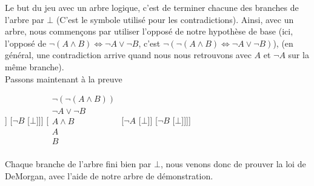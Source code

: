\documentclass[a4paper, 12pt]{article}
\newcommand{\ffi}{\Leftrightarrow}
\numberwithin{equation}{subsection}
\begin{document}
  Le but du jeu avec un arbre logique, c'est de terminer chacune des branches de l'arbre par $\bot$ (C'est le symbole utilisé pour les contradictions). Ainsi, avec un arbre, nous commençons par utiliser l'opposé de notre hypothèse de base (ici, l'opposé de $\neg (A \land B) \ffi \neg A \lor \neg B$, c'est $\neg (\neg (A \land B) \ffi \neg A \lor \neg B)$), (en général, une contradiction arrive quand nous nous retrouvons avec $A$ et $\neg A$ sur la même branche). \\

  Passons maintenant à la preuve
  \begin{center}
  \begin{forest}
  [$\neg (\neg (A \land B) \ffi \neg A \lor \neg B)$
  [$\begin{array}{c}
    \neg(A \land B)\\
    \neg (\neg A \lor \neg B)\\
    A \\
    B \\
   \end{array}$
    [$\neg A$
    [$\bot$]]
    [$\neg B$
    [$\bot$]]]
    [$\begin{array}{c}
        \neg (\neg (A \land B)) \\
        \neg A \lor \neg B \\
        A \land B \\
        A \\
        B \\
      \end{array}$
    [$\neg A$
    [$\bot$]]
    [$\neg B$
    [$\bot$]]]]
  \end{forest}
\end{center}
Chaque branche de l'arbre fini bien par $\bot$, nous venons donc de prouver la loi de DeMorgan, avec l'aide de notre arbre de démonstration. \\
\end{document}
